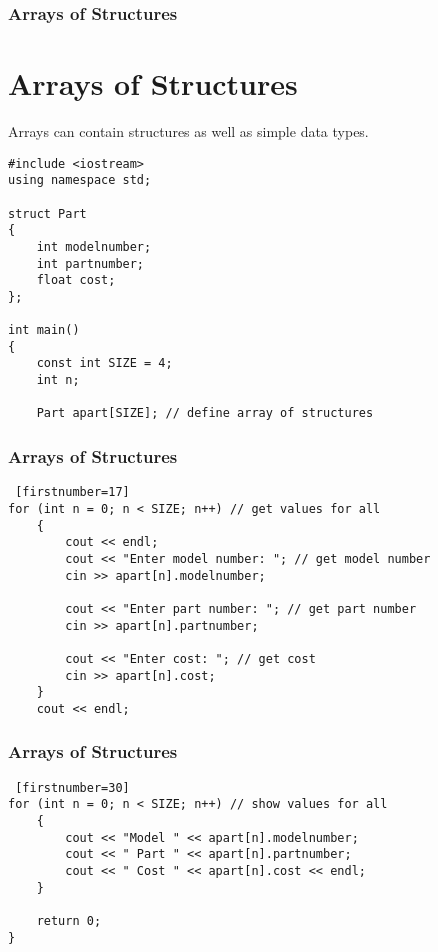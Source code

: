 \documentclass{beamer}
\begin{document}
\begin{frame}[fragile]\frametitle{Arrays of Structures}
    \section{Arrays of Structures} %
    \label{sec:arrays_of_structures}
    Arrays can contain structures as well as simple data types.
    \lstset{style=mystyle}
\begin{lstlisting}
#include <iostream>
using namespace std;

struct Part
{
    int modelnumber;
    int partnumber;
    float cost;
};

int main()
{
    const int SIZE = 4;
    int n;

    Part apart[SIZE]; // define array of structures
\end{lstlisting}
\end{frame}

\begin{frame}[fragile]\frametitle{Arrays of Structures}
    \lstset{style=mystyle}
\begin{lstlisting} [firstnumber=17]
for (int n = 0; n < SIZE; n++) // get values for all
    {
        cout << endl;
        cout << "Enter model number: "; // get model number
        cin >> apart[n].modelnumber;

        cout << "Enter part number: "; // get part number
        cin >> apart[n].partnumber;

        cout << "Enter cost: "; // get cost
        cin >> apart[n].cost;
    }
    cout << endl;
\end{lstlisting}
\end{frame}

\begin{frame}[fragile]\frametitle{Arrays of Structures}
    \lstset{style=mystyle}
    \begin{lstlisting} [firstnumber=30]
for (int n = 0; n < SIZE; n++) // show values for all
    {
        cout << "Model " << apart[n].modelnumber;
        cout << " Part " << apart[n].partnumber;
        cout << " Cost " << apart[n].cost << endl;
    }

    return 0;
}
\end{lstlisting}
\end{frame}
\end{document}
